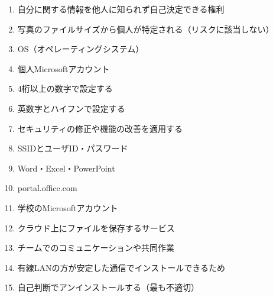 \documentclass[b4paper,7pt,twocolumn,landscape]{jsarticle}
\begin{document}
{\begin{enumerate}
  \item 自分に関する情報を他人に知られず自己決定できる権利
  \item 写真のファイルサイズから個人が特定される（リスクに該当しない）
  \item OS（オペレーティングシステム）
  \item 個人Microsoftアカウント
  \item 4桁以上の数字で設定する
  \item 英数字とハイフンで設定する
  \item セキュリティの修正や機能の改善を適用する
  \item SSIDとユーザID・パスワード
  \item Word・Excel・PowerPoint
  \item portal.office.com
  \item 学校のMicrosoftアカウント
  \item クラウド上にファイルを保存するサービス
  \item チームでのコミュニケーションや共同作業
  \item 有線LANの方が安定した通信でインストールできるため
  \item 自己判断でアンインストールする（最も不適切）
\end{enumerate}
}
\end{document}
